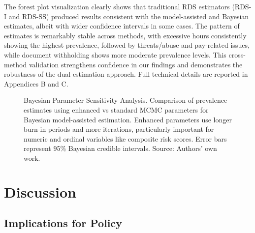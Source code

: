 \documentclass[
  12pt,
  letterpaper,
  DIV=11,
  numbers=noendperiod]{scrartcl}
\theoremstyle{plain}
\theoremstyle{definition}
\begin{document}
The forest plot visualization clearly shows that traditional RDS
estimators (RDS-I and RDS-SS) produced results consistent with the
model-assisted and Bayesian estimates, albeit with wider confidence
intervals in some cases. The pattern of estimates is remarkably stable
across methods, with excessive hours consistently showing the highest
prevalence, followed by threats/abuse and pay-related issues, while
document withholding shows more moderate prevalence levels. This
cross-method validation strengthens confidence in our findings and
demonstrates the robustness of the dual estimation approach. Full
technical details are reported in Appendices B and C.

\begin{figure}[H]


\caption{\label{fig-parameter-comparison}Bayesian Parameter Sensitivity
Analysis. Comparison of prevalence estimates using enhanced vs standard
MCMC parameters for Bayesian model-assisted estimation. Enhanced
parameters use longer burn-in periods and more iterations, particularly
important for numeric and ordinal variables like composite risk scores.
Error bars represent 95\% Bayesian credible intervals. Source: Authors'
own work.}

\end{figure}%

\section{Discussion}\label{discussion}

\subsection{Implications for Policy}\label{implications-for-policy}
\end{document}
